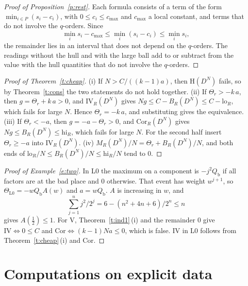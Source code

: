 \documentclass[11pt,a4paper]{article}
\newcommand{\Cor}{\mathrm{Cor}}
\newcommand{\IVb}{\mathrm{IV}}
\newcommand{\Ht}{\mathrm{H}}
\newcommand{\rLz}{\mathrm{L0}}
\newcommand{\lo}{\mathrm{lo}}
\newcommand{\hi}{\mathrm{hi}}
\theoremstyle{plain}
\theoremstyle{definition}
\theoremstyle{remark}
\begin{document}
\begin{proof}[Proof of Proposition~\ref{p:rest}]
Each formula consists of a term of the form $\min_{i\in P}(s_i-c_i)$, with $0\le c_i\le c_{\max}$ and $c_{\max}$ a
local constant, and terms that do not involve the $q$-orders. Since
\[\min_is_i-c_{\max}\le\min_i(s_i-c_i)\le\min_is_i,\]
the remainder lies in an interval that does not depend on the $q$-orders. The readings without the hull and with the
large ball add to or subtract from the value with the hull quantities that do not involve the $q$-orders.
\end{proof}

\begin{proof}[Proof of Theorem~\ref{t:cheap}]
(i) If $N>C/((k-1)a)$, then $\Ht(D^N)$ fails, so by Theorem~\ref{t:cons} the two statements do not hold together.
(ii) If $\Theta_r>-k\,a$, then $g=\Theta_r+k\,a>0$, and $\IVb_R(D^N)$ gives $Ng\le C-B_R(D^N)\le C-\lo_R$, which fails
for large $N$. Hence $\Theta_r=-k\,a$, and substituting gives the equivalence. (iii) If $\Theta_r<-a$, then
$g=-a-\Theta_r>0$, and $\Cor_R(D^N)$ gives $Ng\le B_R(D^N)\le\hi_R$, which fails for large $N$. For the second half
insert $\Theta_r\ge-a$ into $\IVb_R(D^N)$. (iv) $M_R(D^N)/N=\Theta_r+B_R(D^N)/N$, and both ends of
$\lo_R/N\le B_R(D^N)/N\le\hi_R/N$ tend to $0$.
\end{proof}

\begin{proof}[Proof of Example~\ref{e:two}]
In L0 the maximum on a component is $-j^2Q_{\mathrm b}$ if all factors are at the bad place and $0$ otherwise. That
event has weight $w^{j+1}$, so $\Theta_\rLz=-wQ_{\mathrm b}A(w)$ and $a=wQ_{\mathrm b}$. $A$ is increasing in $w$, and
\[\sum_{j=1}^nj^2/2^j=6-(n^2+4n+6)/2^n\le n\]
gives $A(\frac12)\le1$. For V, Theorem~\ref{t:ind1}\,(i) and the remainder $0$ give $\IVb\iff0\le C$ and
$\Cor\iff(k-1)Na\le0$, which is false. IV in L0 follows from Theorem~\ref{t:cheap}\,(i) and $\Cor$.
\end{proof}

\section{Computations on explicit data}\label{s:data}
\end{document}
